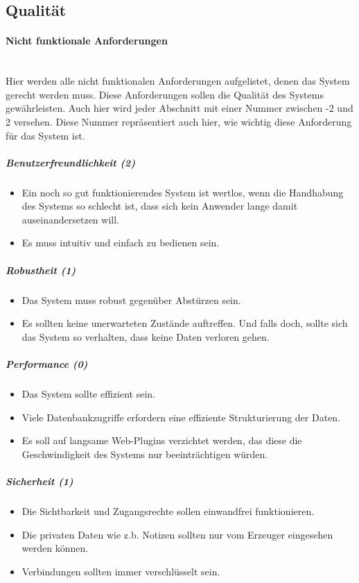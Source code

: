 \documentclass[12pt,a4paper]{article}
\begin{document}
{\subsection{Qualität}

\paragraph{Nicht funktionale Anforderungen}\mbox{}\\
Hier werden alle nicht funktionalen Anforderungen aufgelistet, denen das System gerecht werden muss. Diese Anforderungen sollen die Qualität des Systems gewährleisten. Auch hier wird jeder Abschnitt mit einer Nummer zwischen -2 und 2 versehen. Diese Nummer repräsentiert auch hier, wie wichtig diese Anforderung für das System ist.

\subparagraph{Benutzerfreundlichkeit (2)}
\begin{itemize}
	\item Ein noch so gut funktionierendes System ist wertlos, wenn die Handhabung des Systems so schlecht ist, dass sich kein Anwender lange damit auseinandersetzen will. 
	\item Es muss intuitiv und einfach zu bedienen sein.
\end{itemize}
\subparagraph{Robustheit (1)}
\begin{itemize}
	\item Das System muss robust gegenüber Abstürzen sein. 
	\item Es sollten keine unerwarteten Zustände auftreffen. Und falls doch, sollte sich das System so verhalten, dass keine Daten verloren gehen.
\end{itemize}
\subparagraph{Performance (0)}
\begin{itemize}
	\item Das System sollte effizient sein.
	\item Viele Datenbankzugriffe erfordern eine effiziente Strukturierung der Daten.
	\item Es soll auf langsame Web-Plugins verzichtet werden, das diese die Geschwindigkeit des Systems nur beeinträchtigen würden. 
\end{itemize}
\subparagraph{Sicherheit (1)}
\begin{itemize}
	\item Die Sichtbarkeit und Zugangsrechte sollen einwandfrei funktionieren.
	\item Die privaten Daten wie z.b. Notizen sollten nur vom Erzeuger eingesehen werden können.
	\item Verbindungen sollten immer verschlüsselt sein.

\end{itemize}}
\end{document}

